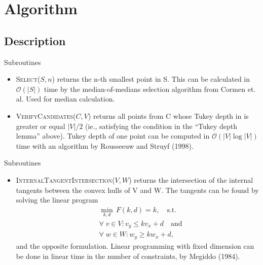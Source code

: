 \documentclass{beamer}
\newcommand{\order}[1]{\ensuremath{\mathcal{O}(#1)}}
\begin{document}


\section{Algorithm}

\subsection{Description}
\let\oldcomment\Comment
\renewcommand{\Comment}[1]{\oldcomment{\textit{#1}}}

\begin{frame}{Subroutines}
  \begin{itemize}
  \item \textsc{Select}(\(S, n\)) returns the n-th smallest point in S. This can be calculated in
    \order{|S|} time by the median-of-medians selection algorithm from Cormen et. al. Used for
    median calculation.
  \item \textsc{VerifyCandidates}(\(C, V\)) returns all points from C whose Tukey depth in is
    greater or equal \(|V|/2\) (ie., satisfying the condition in the \enquote{Tukey depth lemma}
    above). Tukey depth of one point can be computed in \order{|V| \log |V|} time with an algorithm
    by Rousseeuw and Struyf (1998).
  \end{itemize}
\end{frame}


\begin{frame}{Subroutines}
  \begin{itemize}
  \item \textsc{InternalTangentIntersection}(\(V, W\)) returns the intersection of the internal
    tangents between the convex hulls of V and W. The tangents can be found by solving the linear
    program
    \begin{align*}
      &\min_{k, d}\, F(k, d) = k, \quad \text{s.t.}\\
      &\forall\; v \in V: v_y \leq k  v_x + d \quad \text{and} \\
      &\forall\; w \in W: w_y \geq k  w_x + d,
    \end{align*}
    and the opposite formulation. Linear programming with fixed dimension can be done in linear time
    in the number of constraints, by Megiddo (1984).
  \end{itemize}
\end{frame}
\end{document}
